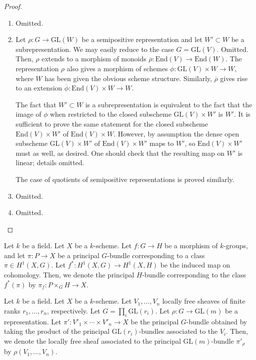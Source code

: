 \begin{proof}
\begin{enumerate}
\item Omitted.
\item Let $\rho:G\to \mathrm{GL}(W)$ be a semipositive representation and let $W'\subset W$ be a subrepresentation. 
We may easily reduce to the case $G=\mathrm{GL}(V)$. Omitted.
Then, $\rho$ extends to a morphism of monoids $\overline{\rho}:\mathrm{End}(V)\to \mathrm{End}(W)$. 
The representation $\rho$ also gives a morphism of schemes $\phi:\mathrm{GL}(V)\times W\to W$, where $W$ has been given the obvious scheme structure. 
Similarly, $\overline{\rho}$ gives rise to an extension $\overline{\phi}:\mathrm{End}(V)\times W\to W$. 

The fact that $W'\subset W$ is a subrepresentation is equivalent to the fact that the image of $\phi$ when restricted to the closed subscheme $\mathrm{GL}(V)\times W'$ is $W'$. 
It is sufficient to prove the same statement for the closed subscheme $\mathrm{End}(V)\times W'$ of $\mathrm{End}(V)\times W$. 
However, by assumption the dense open subscheme $\mathrm{GL}(V)\times W'$ of $\mathrm{End}(V)\times W'$ maps to $W'$, so $\mathrm{End}(V)\times W'$ must as well, as desired. One should check that the resulting map on $W'$ is linear; details omitted.                                                                                                                                                                                                                                  

The case of quotients of semipositive representations is proved similarly.
\item Omitted.
\item Omitted.
\end{enumerate}
\end{proof}



\begin{definition}
Let $k$ be a field.
Let $X$ be a $k$-scheme.
Let $f:G\to H$ be a morphism of $k$-groups, and let $\pi:P\to X$ be a principal $G$-bundle corresponding to a class $\pi\in H^1(X,G)$. 
Let $f^{*}:H^1(X,G)\to H^1(X,H)$ be the induced map on cohomology. 
Then, we denote the principal $H$-bundle corresponding to the class $f^{*}(\pi)$ by $\pi_f:P\times_{G}H\to X$.
\end{definition}

\begin{definition}
Let $k$ be a field.
Let $X$ be a $k$-scheme. 
Let $V_1,\ldots,V_n$ locally free sheaves of finite ranks $r_1,\dots, r_n$, respectively.
Let $G=\prod_i \mathrm{GL}(r_i)$.
Let $\rho:G\rightarrow \mathrm{GL}(m)$ be a representation. 
Let $\pi':V'_1\times\cdots\times V'_n\to X$ be the principal $G$-bundle obtained by taking the product of the principal $\mathrm{GL}(r_i)$-bundles associated to the $V_i$.
Then, we denote the locally free sheaf associated to the principal $\mathrm{GL}(m)$-bundle $\pi'_{\rho}$ by $\rho(V_1,\dots, V_n)$.
\end{definition}

